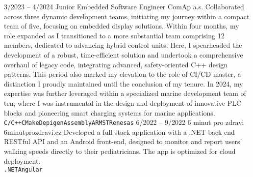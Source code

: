 \documentclass[9pt]{developercv} %
\begin{document}


\begin{entrylist}
	\entry
		{3/2023 -- 4/2024}
    	{Junior Embedded Software Engineer}
		{ComAp a.s.}
    	{Collaborated across three dynamic development teams, initiating my journey within a compact team of five, focusing on embedded display solutions. Within four months, my role expanded as I transitioned to a more substantial team comprising 12 members, dedicated to advancing hybrid control units. Here, I spearheaded the development of a robust, time-efficient solution and undertook a comprehensive overhaul of legacy code, integrating advanced, safety-oriented C++ design patterns. This period also marked my elevation to the role of CI/CD master, a distinction I proudly maintained until the conclusion of my tenure. In 2024, my expertise was further leveraged within a specialized marine development team of ten, where I was instrumental in the design and deployment of innovative PLC blocks and pioneering smart charging systems for marine applications.\\ \texttt{C/C++}\slashsep\texttt{CMake}\slashsep\texttt{Depigen}\slashsep\texttt{Assembly}\slashsep\texttt{ARM}\slashsep\texttt{ST}\slashsep\texttt{Renesas}}
	\entry
		{6/2022 -- 9/2022}
		{6 minut pro zdravi}
		{6minutprozdravi.cz}
		{Developed a full-stack application with a .NET back-end RESTful API and an Android front-end, designed to monitor and report users' walking speeds directly to their pediatricians. The app is optimized for cloud deployment.\\ \texttt{.NET}\slashsep\texttt{Angular}}
\end{entrylist}


\end{document}
